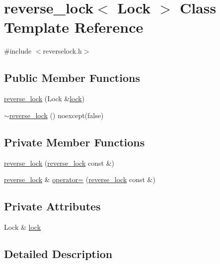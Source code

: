 \hypertarget{classreverse__lock}{}\section{reverse\+\_\+lock$<$ Lock $>$ Class Template Reference}
\label{classreverse__lock}


{\ttfamily \#include $<$reverselock.\+h$>$}

\subsection*{Public Member Functions}
\begin{DoxyCompactItemize}
\item 
\mbox{\hyperlink{classreverse__lock_ad0eb788e8f41452d24dbf32cdf0e6c16}{reverse\+\_\+lock}} (Lock \&\mbox{\hyperlink{classreverse__lock_a915524c7621bb83ccca8e7368d4f0b88}{lock}})
\item 
\mbox{\hyperlink{classreverse__lock_ac778531cac92787864e3f4a84d86da93}{$\sim$reverse\+\_\+lock}} () noexcept(false)
\end{DoxyCompactItemize}
\subsection*{Private Member Functions}
\begin{DoxyCompactItemize}
\item 
\mbox{\hyperlink{classreverse__lock_a28150c909bbb044879563627b3207a43}{reverse\+\_\+lock}} (\mbox{\hyperlink{classreverse__lock}{reverse\+\_\+lock}} const \&)
\item 
\mbox{\hyperlink{classreverse__lock}{reverse\+\_\+lock}} \& \mbox{\hyperlink{classreverse__lock_acde60471a1c26c4bcde36445a813dae4}{operator=}} (\mbox{\hyperlink{classreverse__lock}{reverse\+\_\+lock}} const \&)
\end{DoxyCompactItemize}
\subsection*{Private Attributes}
\begin{DoxyCompactItemize}
\item 
Lock \& \mbox{\hyperlink{classreverse__lock_a915524c7621bb83ccca8e7368d4f0b88}{lock}}
\end{DoxyCompactItemize}


\subsection{Detailed Description}
